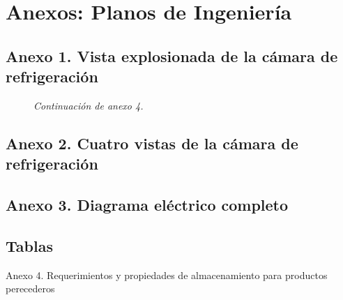 \newpage
\setcounter{chapter}{6}
\setcounter{section}{0}
\rsp \rsp \chapter*{Anexos: Planos de Ingeniería}\rsp\rsp
{} 

\section{Anexo 1. Vista explosionada de la cámara de refrigeración} 

\begin{minipage}{\textwidth} 
	\begin{figure}[H]
	\centering 
	\caption*{\textit{Continuación de anexo 4.}}\rsp\rsp\rsp\rsp
	\vspace{6cm}
	
	\label{axo:vista-explosionada}
\end{figure} 
\end{minipage}
\newpage
\section{Anexo 2. Cuatro vistas de la cámara de refrigeración} 
\begin{minipage}{\textwidth} 
	\begin{figure}[H]
		\centering 
		
		\label{axo:vista-camara}
	\end{figure} 
\end{minipage}

\newpage
\section{Anexo 3. Diagrama eléctrico completo} 
\begin{minipage}{\textwidth} 
	\begin{figure}[H]
		\centering 
		
		\label{axo:diag-electrico}
	\end{figure} 
\end{minipage}

 




\newpage
\begin{minipage}{\textwidth}
	\section*{Tablas}
	\rsp \rsp	 
		\begin{table}[H]
 \centering
 \caption*{Anexo 4. Requerimientos y propiedades de almacenamiento para productos perecederos}\rsp\rsp\rsp

 \label{anexo:bohn-perecederos}
		\end{table}		
	\end{minipage}
	
